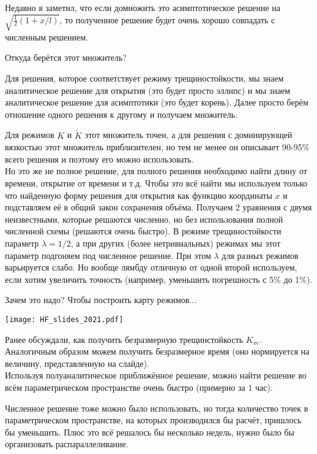 \documentclass[main.tex]{subfiles}
\begin{document}
Недавно я заметил, что если домножить это асимптотическое решение на $\sqrt{\frac{1}{2}\left(1+x/l\right)}$, то полученное решение будет очень хорошо совпадать с численным решением.

Откуда берётся этот множитель?

Для решения, которое соответствует режиму трещиностойкости, мы знаем аналитическое решение для открытия (это будет просто эллипс) и мы знаем аналитическое решение для асимптотики (это будет корень).
Далее просто берём отношение одного решения к другому и получаем множитель.

Для режимов $K$ и $\tilde{K}$ этот множитель точен, а для решения с доминирующей вязкостью этот множитель приблизителен, но тем не менее он описывает 90-95\% всего решения и поэтому его можно использовать.
\\

Но это же не полное решение, для полного решения необходимо найти длину от времени, открытие от времени и т.д.
Чтобы это всё найти мы используем только что найденную форму решения для открытия как функцию координаты $x$ и подставляем её в общий закон сохранения объёма.
Получаем 2 уравнения с двумя неизвестными, которые решаются численно, но без использования полной численной схемы (решаются очень быстро).
В режиме трещиностойкости параметр $\lambda=1/2$, а при других (более нетривиальных) режимах мы этот параметр подгоняем под численное решение.
При этом $\lambda$ для разных режимов варьируется слабо.
Но вообще лямбду отличную от одной второй используем, если хотим увеличить точность (например, уменьшить погрешность с 5\% до 1\%).

Зачем это надо?
Чтобы построить карту режимов...

\texttt{[image: HF\_slides\_2021.pdf]}

Ранее обсуждали, как получить безразмерную трещинстойкость $K_m$.
Аналогичным образом можем получить безразмерное время (оно нормируется на величину, представленную на слайде).
\\

Используя полуаналитическое приближённое решение, можно найти решение во всём параметрическом пространстве очень быстро (примерно за 1 час).

Численное решение тоже можно было использовать, но тогда количество точек в параметрическом пространстве, на которых производился бы расчёт, пришлось бы уменьшить.
Плюс это всё решалось бы несколько недель, нужно было бы организовать распараллеливание.
\end{document}
